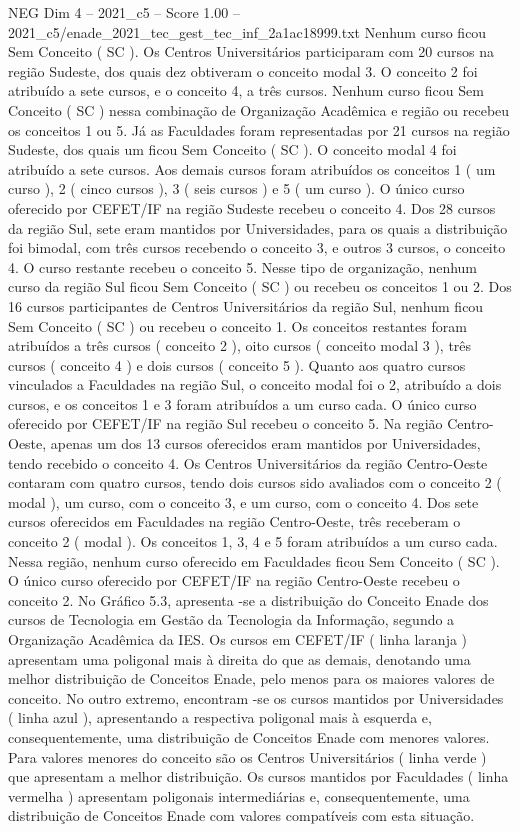 \begin{textsample}{NEG Dim 4 – 2021\_c5 – Score 1.00 – 2021\_c5/enade\_2021\_tec\_gest\_tec\_inf\_2a1ac18999.txt}
Nenhum curso ficou Sem Conceito ( SC ).
Os Centros Universitários participaram com 20 cursos na região Sudeste, dos quais dez obtiveram o conceito modal 3.
O conceito 2 foi atribuído a sete cursos, e o conceito 4, a três cursos.
Nenhum curso ficou Sem Conceito ( SC ) nessa combinação de Organização Acadêmica e região ou recebeu os conceitos 1 ou 5.
Já as Faculdades foram representadas por 21 cursos na região Sudeste, dos quais um ficou Sem Conceito ( SC ).
O conceito modal 4 foi atribuído a sete cursos.
Aos demais cursos foram atribuídos os conceitos 1 ( um curso ), 2 ( cinco cursos ), 3 ( seis cursos ) e 5 ( um curso ).
O único curso oferecido por CEFET/IF na região Sudeste recebeu o conceito 4.
Dos 28 cursos da região Sul, sete eram mantidos por Universidades, para os quais a distribuição foi bimodal, com três cursos recebendo o conceito 3, e outros 3 cursos, o conceito 4.
O curso restante recebeu o conceito 5.
Nesse tipo de organização, nenhum curso da região Sul ficou Sem Conceito ( SC ) ou recebeu os conceitos 1 ou 2.
Dos 16 cursos participantes de Centros Universitários da região Sul, nenhum ficou Sem Conceito ( SC ) ou recebeu o conceito 1.
Os conceitos restantes foram atribuídos a três cursos ( conceito 2 ), oito cursos ( conceito modal 3 ), três cursos ( conceito 4 ) e dois cursos ( conceito 5 ).
Quanto aos quatro cursos vinculados a Faculdades na região Sul, o conceito modal foi o 2, atribuído a dois cursos, e os conceitos 1 e 3 foram atribuídos a um curso cada.
O único curso oferecido por CEFET/IF na região Sul recebeu o conceito 5.
Na região Centro-Oeste, apenas um dos 13 cursos oferecidos eram mantidos por Universidades, tendo recebido o conceito 4.
Os Centros Universitários da região Centro-Oeste contaram com quatro cursos, tendo dois cursos sido avaliados com o conceito 2 ( modal ), um curso, com o conceito 3, e um curso, com o conceito 4.
Dos sete cursos oferecidos em Faculdades na região Centro-Oeste, três receberam o conceito 2 ( modal ).
Os conceitos 1, 3, 4 e 5 foram atribuídos a um curso cada.
Nessa região, nenhum curso oferecido em Faculdades ficou Sem Conceito ( SC ).
O único curso oferecido por CEFET/IF na região Centro-Oeste recebeu o conceito 2.
No Gráfico 5.3, apresenta -se a distribuição do Conceito Enade dos cursos de Tecnologia em Gestão da Tecnologia da Informação, segundo a Organização Acadêmica da IES.
Os cursos em CEFET/IF ( linha laranja ) apresentam uma poligonal mais à direita do que as demais, denotando uma melhor distribuição de Conceitos Enade, pelo menos para os maiores valores de conceito.
No outro extremo, encontram -se os cursos mantidos por Universidades ( linha azul ), apresentando a respectiva poligonal mais à esquerda e, consequentemente, uma distribuição de Conceitos Enade com menores valores.
Para valores menores do conceito são os Centros Universitários ( linha verde ) que apresentam a melhor distribuição.
Os cursos mantidos por Faculdades ( linha vermelha ) apresentam poligonais intermediárias e, consequentemente, uma distribuição de Conceitos Enade com valores compatíveis com esta situação.

\end{textsample}
